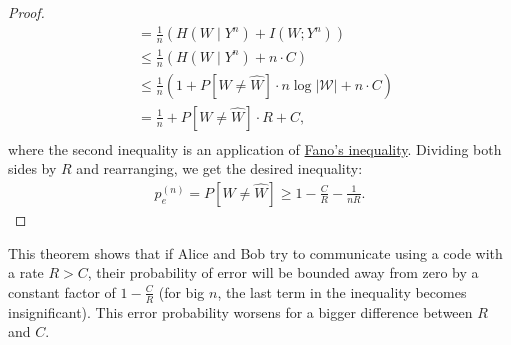 \begin{proof}
\begin{align}
&= \frac{1}{n} \left( H(W \mid Y^n) + I(W;Y^n)\right) \nonumber\\
&\leq \frac{1}{n} \left( H(W \mid Y^n) + n \cdot C\right) \nonumber\\
&\leq \frac{1}{n} \left( 1 + P[W \neq \hat{W}] \cdot n \log |\mathcal{W}| + n \cdot C\right) \nonumber\\
&= \frac{1}{n} + P[W \neq \hat{W}] \cdot R + C, \nonumber\\
\end{align}
where the second inequality is an application of \href{https://en.wikipedia.org/wiki/Fano's_inequality}{Fano's inequality}. Dividing both sides by $R$ and rearranging, we get the desired inequality:
\begin{align}
p_e^{(n)} = P[W \neq \hat{W}] \geq 1 - \frac{C}{R} - \frac{1}{nR}.
\end{align}
\end{proof}
This theorem shows that if Alice and Bob try to communicate using a code with a rate $R > C$, their probability of error will be bounded away from zero by a constant factor of $1 - \frac{C}{R}$ (for big $n$, the last term in the inequality becomes insignificant). This error probability worsens for a bigger difference between $R$ and $C$.











